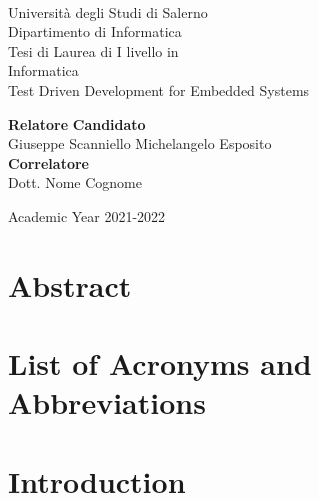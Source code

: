 \documentclass[11pt,oneside]{book}
\theoremstyle{definition}
\begin{document}
    \begin{titlepage}
        \begin{center}
            \\[0.2truecm]
            {\Large Universit\`a degli Studi di Salerno}\\[0.2truecm]
            {\large Dipartimento di Informatica}\\
            \hrulefill
            \vfill
            {\large Tesi di Laurea di I livello in }\\[0.2truecm]
            {\Large Informatica}\\
            \vfill\vfill
            {\Huge Test Driven Development for Embedded Systems}
            \vfill\vfill
            
            
            {\bf Relatore} \hfill {\bf Candidato}\ \ \\
            Giuseppe Scanniello \hfill Michelangelo Esposito\\
            {\bf Correlatore} \hfill {\bf }\ \ \\
            Dott. Nome Cognome \hfill \ \ \\
            
            \vfill
            \hrulefill 
            
            Academic Year 2021-2022
        
        \end{center}
    \end{titlepage}


    \chapter*{Abstract}
    
    
    \tableofcontents
    \pagestyle{plain}

    

    \chapter*{List of Acronyms and Abbreviations}
    

    \chapter{Introduction}
    \setcounter{page}{1} 	%
    
\end{document}
